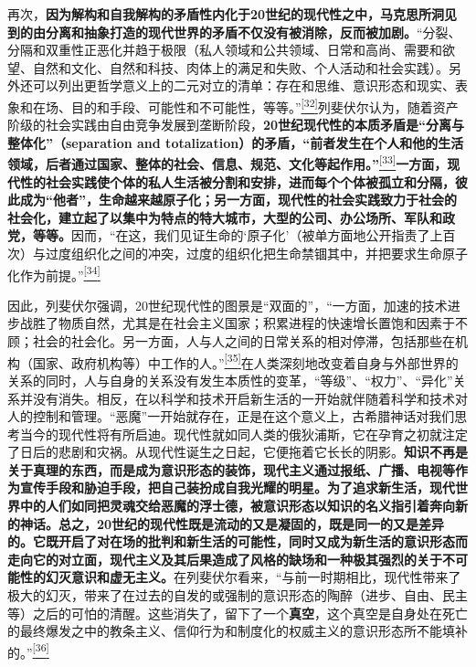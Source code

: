 \documentclass[UTF8, fontset = sourcesans, a4paper, oneside, zihao =
-4, scheme=chinese, no-math, space=true]{ctexbook}
\begin{document}
再次，\textbf{因为解构和自我解构的矛盾性内化于20世纪的现代性之中，马克思所洞见到的由分离和抽象打造的现代世界的矛盾不仅没有被消除，反而被加剧。}``分裂、分隔和双重性正恶化并趋于极限（私人领域和公共领域、日常和高尚、需要和欲望、自然和文化、自然和科技、肉体上的满足和失败、个人活动和社会实践）。另外还可以列出更哲学意义上的二元对立的清单：存在和思维、意识形态和现实、表象和在场、目的和手段、可能性和不可能性，等等。''\protect\hypertarget{part0005_split_002.htmlux5cux23w32}{}{}\protect\hyperlink{part0005_split_003.htmlux5cux23m32}{\textsuperscript{{[}32{]}}}列斐伏尔认为，随着资产阶级的社会实践由自由竞争发展到垄断阶段，\textbf{20世纪现代性的本质矛盾是``分离与整体化''（separation
and
totalization）的矛盾，``前者发生在个人和他的生活领域，后者通过国家、整体的社会、信息、规范、文化等起作用。''}\protect\hypertarget{part0005_split_002.htmlux5cux23w33}{}{}\protect\hyperlink{part0005_split_003.htmlux5cux23m33}{\textsuperscript{{[}33{]}}}\textbf{一方面，现代性的社会实践使个体的私人生活被分割和安排，进而每个个体被孤立和分隔，彼此成为``他者''，生命越来越原子化；另一方面，现代性的社会实践致力于社会的社会化，建立起了以集中为特点的特大城市，大型的公司、办公场所、军队和政党，等等。}因而，``在这，我们见证生命的`原子化'（被单方面地公开指责了上百次）与过度组织化之间的冲突，过度的组织化把生命禁锢其中，并把要求生命原子化作为前提。''\protect\hypertarget{part0005_split_002.htmlux5cux23w34}{}{}\protect\hyperlink{part0005_split_003.htmlux5cux23m34}{\textsuperscript{{[}34{]}}}

因此，列斐伏尔强调，20世纪现代性的图景是``双面的''，``一方面，加速的技术进步战胜了物质自然，尤其是在社会主义国家；积累进程的快速增长置饱和因素于不顾；社会的社会化。另一方面，人与人之间的日常关系的相对停滞，包括那些在机构（国家、政府机构等）中工作的人。''\protect\hypertarget{part0005_split_002.htmlux5cux23w35}{}{}\protect\hyperlink{part0005_split_003.htmlux5cux23m35}{\textsuperscript{{[}35{]}}}在人类深刻地改变着自身与外部世界的关系的同时，人与自身的关系没有发生本质性的变革，``等级''、``权力''、``异化''关系并没有消失。相反，在以科学和技术开启新生活的一开始就伴随着科学和技术对人的控制和管理。``恶魔''一开始就存在，正是在这个意义上，古希腊神话对我们思考当今的现代性将有所启迪。现代性就如同人类的俄狄浦斯，它在孕育之初就注定了日后的悲剧和灾祸。从现代性诞生之日起，它便拖着它长长的阴影。\textbf{知识不再是关于真理的东西，而是成为意识形态的装饰，现代主义通过报纸、广播、电视等作为宣传手段和胁迫手段，把自己装扮成自我光耀的明星。为了追求新生活，现代世界中的人们如同把灵魂交给恶魔的浮士德，被意识形态以知识的名义指引着奔向新的神话。总之，20世纪的现代性既是流动的又是凝固的，既是同一的又是差异的。它既开启了对在场的批判和新生活的可能性，同时又成为新生活的意识形态而走向它的对立面，现代主义及其后果造成了风格的缺场和一种极其强烈的关于不可能性的幻灭意识和虚无主义。}在列斐伏尔看来，``与前一时期相比，现代性带来了极大的幻灭，带来了在过去的自发的或强制的意识形态的陶醉（进步、自由、民主等）之后的可怕的清醒。这些消失了，留下了一个\textbf{真空}，这个真空是自身处在死亡的最终爆发之中的教条主义、信仰行为和制度化的权威主义的意识形态所不能填补的。''\protect\hypertarget{part0005_split_002.htmlux5cux23w36}{}{}\protect\hyperlink{part0005_split_003.htmlux5cux23m36}{\textsuperscript{{[}36{]}}}
\end{document}
